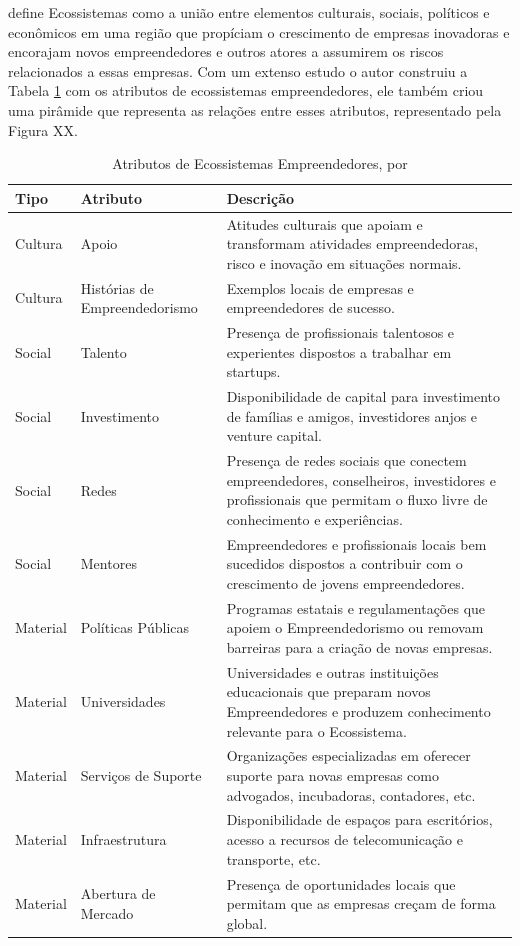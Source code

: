  define Ecossistemas como a união entre elementos culturais, sociais, políticos e econômicos em uma região que propíciam o crescimento de empresas inovadoras e encorajam novos empreendedores e outros atores a assumirem os riscos relacionados a essas empresas. Com um extenso estudo o autor construiu a Tabela \ref{table:attributes_of_entrepreneurship_ecosystems} com os atributos de ecossistemas empreendedores, ele também criou uma pirâmide que representa as relações entre esses atributos, representado pela Figura XX.

\begin{table}[!htb]
	\centering
	\begin{tabular}{ | p{3cm} | p{4cm} | p{8cm} | }
		\hline
		Tipo & Atributo & Descrição \\ \hline
		Cultura & Apoio & Atitudes culturais que apoiam e transformam atividades empreendedoras, risco e inovação em situações normais. \\ \hline
		Cultura & Histórias de Empreendedorismo & Exemplos locais de empresas e empreendedores de sucesso. \\ \hline
		Social & Talento & Presença de profissionais talentosos e experientes dispostos a trabalhar em startups. \\ \hline
		Social & Investimento & Disponibilidade de capital para investimento de famílias e amigos, investidores anjos e venture capital. \\ \hline
		Social & Redes & Presença de redes sociais que conectem empreendedores, conselheiros, investidores e profissionais que permitam o fluxo livre de conhecimento e experiências. \\ \hline
		Social & Mentores & Empreendedores e profissionais locais bem sucedidos dispostos a contribuir com o crescimento de jovens empreendedores. \\ \hline
		Material & Políticas Públicas & Programas estatais e regulamentações que apoiem o Empreendedorismo ou removam barreiras para a criação de novas empresas. \\ \hline
		Material & Universidades & Universidades e outras instituições educacionais que preparam novos Empreendedores e produzem conhecimento relevante para o Ecossistema. \\ \hline
		Material & Serviços de Suporte & Organizações especializadas em oferecer suporte para novas empresas como advogados, incubadoras, contadores, etc. \\ \hline
		Material & Infraestrutura & Disponibilidade de espaços para escritórios, acesso a recursos de telecomunicação e transporte, etc. \\ \hline
		Material & Abertura de Mercado & Presença de oportunidades locais que permitam que as empresas creçam de forma global. \\ \hline
	\end{tabular}
	\caption{Atributos de Ecossistemas Empreendedores, por \cite{Spigel2015}}
	\label{table:attributes_of_entrepreneurship_ecosystems}
\end{table}

